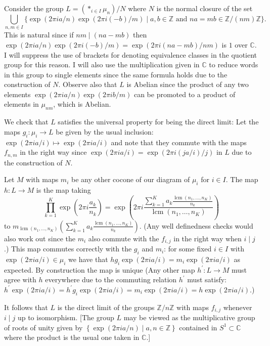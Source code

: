 \documentclass[11pt]{article}
\newcommand{\br}[1]{\left(#1\right)}
\newcommand{\cbr}[1]{\left\{#1\right\}}
\DeclareMathOperator{\lcm}{lcm}
\begin{document}
\begin{enumerate}[label=(\alph*)]
    Consider the group $L = (\ast_{i\in I}\mu_n)/N$ where $N$ is the normal closure of the set \[\bigcup_{n,m\in I}\{\exp(2\pi i a/n)\exp(2\pi i (-b)/m)\mid a,b\in\mathbb{Z}\text{ and } na = mb \in \mathbb{Z}/(nm)\mathbb{Z}\}.\] This is natural since if $nm\mid (na -mb)$ then $\exp(2\pi i a/n)\exp(2\pi i (-b)/m) = \exp(2\pi i (na-mb)/nm)$ is $1$ over $\mathbb{C}$. I will suppress the use of brackets for denoting equivalence classes in the quotient group for this reason. I will also use the multiplication given in $\mathbb{C}$ to reduce words in this group to single elements since the same formula holds due to the construction of $N$. Observe also that $L$ is Abelian since the product of any two elements $\exp(2\pi i a/n)\exp(2\pi i b/m)$ can be promoted to a product of elements in $\mu_{nm}$, which is Abelian.

    We check that $L$ satisfies the universal property for being the direct limit: Let the maps $g_i\colon \mu_i\to L$ be given by the usual inclusion: $\exp(2\pi i a/i)\mapsto \exp(2\pi i a/i)$ and note that they commute with the maps $f_{n,m}$ in the right way since $\exp(2\pi i a/i) = \exp(2\pi i (ja/i)/j)$ in $L$ due to the construction of $N$.
    
    Let $M$ with maps $m_i$ be any other cocone of our diagram of $\mu_i$ for $i\in I$. The map $h\colon L\to M$ is the map taking \[\prod_{k=1}^K\exp\br{2\pi i \frac{a_k}{n_k}} = \exp\br{2\pi i\frac{\sum_{k=1}^Ka_k\frac{\lcm(n_1,\dots,n_K)}{n_k}}{\lcm(n_1,\dots,n_K)}}\] to $m_{\lcm(n_1,\dots,n_K)}\br{\sum_{k=1}^Ka_k\frac{\lcm(n_1,\dots,n_K)}{n_k}}$. (Any well definedness checks would also work out since the $m_i$ also commute with the $f_{i,j}$ in the right way when $i\mid j$.) This map commutes correctly with the $g_i$ and $m_i$: for some fixed $i\in I$ with $\exp(2\pi i a/i)\in \mu_i$ we have that $hg_i\exp(2\pi i a/i)= m_i\exp(2\pi i a/i)$ as expected. By construction the map is unique (Any other map $h^\prime\colon L\to M$ must agree with $h$ everywhere due to the commuting relation $h^\prime$ must satisfy: $h^\prime \exp(2\pi i a/i) = h^\prime g_i\exp(2\pi i a/i) = m_i\exp(2\pi i a/i) = h\exp(2\pi i a/i)$.)

    It follows that $L$ is the direct limit of the groups $\mathbb{Z}/n\mathbb{Z}$ with maps $f_{i,j}$ whenever $i\mid j$ up to isomorphism. [The group $L$ may be viewed as the multiplicative group of roots of unity given by $\cbr{\exp(2\pi i a/n)\mid a,n\in \mathbb{Z}}$ contained in $S^1\subset \mathbb{C}$ where the product is the usual one taken in $\mathbb{C}$.]
    
\end{enumerate}
\end{document}
